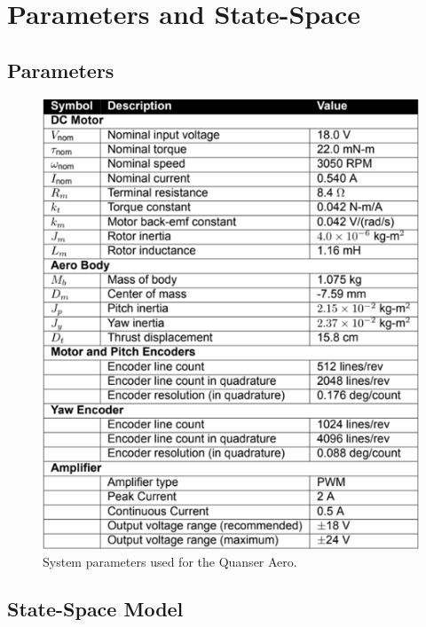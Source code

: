\chapter{Parameters and State-Space}
\label{ch: AppendixA}

\section{Parameters}

\begin{figure}[!htbp]
 \begin{center}
  \includegraphics[scale=.75]{figs/img/quanserAeroSystemParameters}
 \end{center}
\caption{System parameters used for the Quanser Aero.}
\label{fig.systemParameters}
\end{figure}



\section{State-Space Model}




